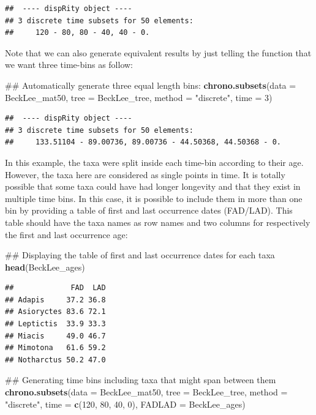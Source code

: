 \documentclass[]{book}
\newenvironment{Shaded}{\begin{snugshade}}{\end{snugshade}}
\newcommand{\KeywordTok}[1]{\textcolor[rgb]{0.13,0.29,0.53}{\textbf{#1}}}
\newcommand{\DataTypeTok}[1]{\textcolor[rgb]{0.13,0.29,0.53}{#1}}
\newcommand{\DecValTok}[1]{\textcolor[rgb]{0.00,0.00,0.81}{#1}}
\newcommand{\StringTok}[1]{\textcolor[rgb]{0.31,0.60,0.02}{#1}}
\newcommand{\NormalTok}[1]{#1}
\theoremstyle{definition}
\theoremstyle{definition}
\theoremstyle{definition}
\theoremstyle{remark}
\begin{document}
\begin{verbatim}
##  ---- dispRity object ---- 
## 3 discrete time subsets for 50 elements:
##     120 - 80, 80 - 40, 40 - 0.
\end{verbatim}

Note that we can also generate equivalent results by just telling the
function that we want three time-bins as follow:

\begin{Shaded}
\begin{Highlighting}[]
\NormalTok{## Automatically generate three equal length bins:}
\KeywordTok{chrono.subsets}\NormalTok{(}\DataTypeTok{data =}\NormalTok{ BeckLee_mat50, }\DataTypeTok{tree =}\NormalTok{ BeckLee_tree, }\DataTypeTok{method =} \StringTok{"discrete"}\NormalTok{,}
                \DataTypeTok{time =} \DecValTok{3}\NormalTok{)}
\end{Highlighting}
\end{Shaded}

\begin{verbatim}
##  ---- dispRity object ---- 
## 3 discrete time subsets for 50 elements:
##     133.51104 - 89.00736, 89.00736 - 44.50368, 44.50368 - 0.
\end{verbatim}

In this example, the taxa were split inside each time-bin according to
their age. However, the taxa here are considered as single points in
time. It is totally possible that some taxa could have had longer
longevity and that they exist in multiple time bins. In this case, it is
possible to include them in more than one bin by providing a table of
first and last occurrence dates (FAD/LAD). This table should have the
taxa names as row names and two columns for respectively the first and
last occurrence age:

\begin{Shaded}
\begin{Highlighting}[]
\NormalTok{## Displaying the table of first and last occurrence dates for each taxa}
\KeywordTok{head}\NormalTok{(BeckLee_ages)}
\end{Highlighting}
\end{Shaded}

\begin{verbatim}
##             FAD  LAD
## Adapis     37.2 36.8
## Asioryctes 83.6 72.1
## Leptictis  33.9 33.3
## Miacis     49.0 46.7
## Mimotona   61.6 59.2
## Notharctus 50.2 47.0
\end{verbatim}

\begin{Shaded}
\begin{Highlighting}[]
\NormalTok{## Generating time bins including taxa that might span between them}
\KeywordTok{chrono.subsets}\NormalTok{(}\DataTypeTok{data =}\NormalTok{ BeckLee_mat50, }\DataTypeTok{tree =}\NormalTok{ BeckLee_tree, }\DataTypeTok{method =} \StringTok{"discrete"}\NormalTok{,}
                \DataTypeTok{time =} \KeywordTok{c}\NormalTok{(}\DecValTok{120}\NormalTok{, }\DecValTok{80}\NormalTok{, }\DecValTok{40}\NormalTok{, }\DecValTok{0}\NormalTok{), }\DataTypeTok{FADLAD =}\NormalTok{ BeckLee_ages)}
\end{Highlighting}
\end{Shaded}
\end{document}
